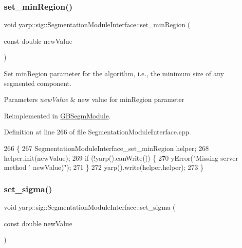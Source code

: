 \subsubsection{\texorpdfstring{set\+\_\+min\+Region()}{set\_minRegion()}}
{\footnotesize\ttfamily void yarp\+::sig\+::\+Segmentation\+Module\+Interface\+::set\+\_\+min\+Region (\begin{DoxyParamCaption}\item[{const double}]{new\+Value }\end{DoxyParamCaption})\hspace{0.3cm}{\ttfamily [virtual]}}



Set min\+Region parameter for the algorithm, i.\+e., the minimum size of any segmented component. 


\begin{DoxyParams}{Parameters}
{\em new\+Value} & new value for min\+Region parameter \\
\hline
\end{DoxyParams}


Reimplemented in \hyperlink{classGBSegmModule_ae1c722c9c774cbde4f6bfada3f0826ba}{G\+B\+Segm\+Module}.



Definition at line 266 of file Segmentation\+Module\+Interface.\+cpp.


\begin{DoxyCode}
266                                                                      \{
267   SegmentationModuleInterface\_set\_minRegion helper;
268   helper.init(newValue);
269   \textcolor{keywordflow}{if} (!yarp().canWrite()) \{
270     yError(\textcolor{stringliteral}{"Missing server method '%
       newValue)"});
271   \}
272   yarp().write(helper,helper);
273 \}
\end{DoxyCode}
\mbox{\label{classyarp_1_1sig_1_1SegmentationModuleInterface_a68f28930df5e930934c0ee56ad1f680c}} 
\subsubsection{\texorpdfstring{set\+\_\+sigma()}{set\_sigma()}}
{\footnotesize\ttfamily void yarp\+::sig\+::\+Segmentation\+Module\+Interface\+::set\+\_\+sigma (\begin{DoxyParamCaption}\item[{const double}]{new\+Value }\end{DoxyParamCaption})\hspace{0.3cm}{\ttfamily [virtual]}}



